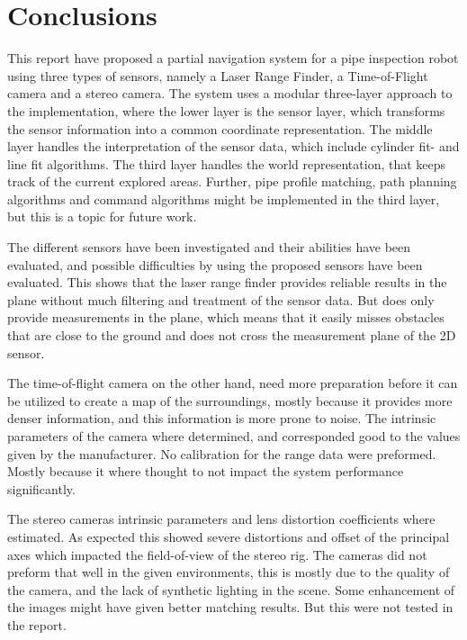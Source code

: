 
\chapter{Conclusions}
\label{chap9}
This report have proposed a partial navigation system for a pipe inspection robot using three
types of sensors, namely a Laser Range Finder, a Time-of-Flight camera and a stereo
camera. The system uses a modular three-layer approach to the implementation, where the lower layer is the
sensor layer, which transforms the sensor information into a common coordinate
representation. The middle layer handles the interpretation of the sensor data, which include cylinder fit-
and line fit algorithms. The third layer handles the world representation, that keeps track of
the current explored areas. Further, pipe profile matching, path planning algorithms and command
algorithms might be implemented in the third layer, but this is a topic for future work. 

The different sensors have been investigated and their abilities have been
evaluated, and possible difficulties by using the proposed sensors have been evaluated.
This shows that the laser range finder provides reliable results in the plane without much
filtering and treatment of the sensor data. But does only provide measurements in the
plane, which means that it easily misses obstacles that are close to the ground and does
not cross the measurement plane of the 2D sensor. 

The time-of-flight camera on the other hand,
need more preparation before it can be utilized to create a map of the surroundings,
mostly because it provides more denser information, and this information is more prone to
noise. The intrinsic parameters of the camera where determined, and corresponded good to
the values given by the manufacturer. No calibration for the range data were preformed.
Mostly because it where thought to not impact the system performance significantly. 

The stereo cameras intrinsic parameters and lens distortion coefficients where estimated.
As expected this showed severe distortions and offset of the principal axes which impacted
the field-of-view of the stereo rig. The cameras did not preform that well in the given
environments, this is mostly due to the quality of the camera, and the lack of synthetic
lighting in the scene. Some enhancement of the images might have given better matching
results. But this were not tested in the report. 

